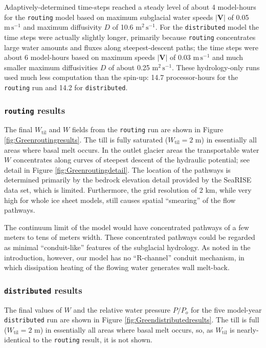 \documentclass[gmd]{copernicus}   %
\begin{document}
Adaptively-determined time-steps reached a steady level of about 4 model-hours for the \texttt{routing} model based on maximum subglacial water speeds $|\mathbf{V}|$ of 0.05 $\text{m}\,\text{s}^{-1}$ and maximum diffusivity $D$ of 10.6 $\text{m}^2\,\text{s}^{-1}$.  For the \texttt{distributed} model the time steps were actually slightly longer, primarily because \texttt{routing} concentrates large water amounts and fluxes along steepest-descent paths; the time steps were about 6 model-hours based on maximum speeds $|\mathbf{V}|$ of 0.03 $\text{m}\,\text{s}^{-1}$ and much smaller maximum diffusivities $D$ of about 0.25 $\text{m}^2\,\text{s}^{-1}$.    These hydrology-only runs used much less computation than the spin-up: 14.7 processor-hours for the \texttt{routing} run and 14.2 for \texttt{distributed}. 

\subsubsection{\texttt{routing} results}  The final $W_{\text{til}}$ and $W$ fields from the \texttt{routing} run are shown in Figure \ref{fig:Greenroutingresults}.  The till is fully saturated ($W_{\text{til}}=2$ m) in essentially all areas where basal melt occurs.  In the outlet glacier areas the transportable water $W$ concentrates along curves of steepest descent of the hydraulic potential; see detail in Figure \ref{fig:Greenroutingdetail}.  The location of the pathways is determined primarily by the bedrock elevation detail provided by the SeaRISE data set, which is limited.  Furthermore, the grid resolution of 2 km, while very high for whole ice sheet models, still causes spatial ``smearing'' of the flow pathways.

The continuum limit of the model would have concentrated pathways of a few meters to tens of meters width.  These concentrated pathways could be regarded as minimal ``conduit-like'' features of the subglacial hydrology.  As noted in the introduction, however, our model has no ``R-channel'' conduit mechanism, in which dissipation heating of the flowing water generates wall melt-back.

\subsubsection{\texttt{distributed} results}  The final values of $W$ and the relative water pressure $P/P_o$ for the five model-year \texttt{distributed} run are shown in Figure \ref{fig:Greendistributedresults}.  The till is full ($W_{\text{til}}=2$ m) in essentially all areas where basal melt occurs, so, as $W_{\text{til}}$ is nearly-identical to the \texttt{routing} result, it is not shown.
\end{document}
